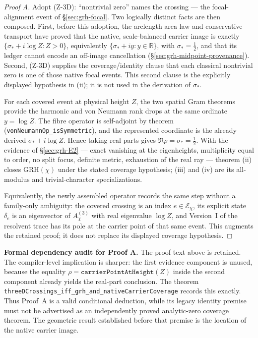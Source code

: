 \begin{proof}[Proof A]
Adopt (Z-3D): ``nontrivial zero'' names the crossing --- the focal-alignment
event of \S\ref{sec:grh-focal}.  Two logically distinct facts are then
composed.  First, before this adoption, the arclength area law and
conservative transport have proved that the native, scale-balanced carrier
image is exactly
\(\{\sigma_*+i\log Z:Z>0\}\), equivalently
\(\{\sigma_*+iy:y\in\mathbb R\}\), with
\(\sigma_*=\tfrac12\), and that its ledger cannot encode an off-image
cancellation (\S\ref{sec:grh-midpoint-provenance}).  Second, (Z-3D) supplies
the coverage/identity clause that each classical nontrivial zero is one of
those native focal events.  This second clause is the explicitly displayed
hypothesis in \textup{(ii)}; it is not used in the derivation of
\(\sigma_*\).

For each covered event at physical height \(Z\), the two spatial Gram
theorems provide the harmonic and von Neumann rank drops at the same
ordinate \(y=\log Z\).  The fibre operator is
self-adjoint by theorem
(\texttt{vonNeumannOp\_isSymmetric}), and the represented coordinate is the
already derived \(\sigma_*+i\log Z\).  Hence taking real parts gives
\(\Re\rho=\sigma_*=\tfrac12\).  With the evidence of
\S\ref{sec:grh-E2} --- exact vanishing at the eigenheights, multiplicity
equal to order, no split focus, definite metric, exhaustion of the real ray
--- theorem \textup{(ii)} closes \(\mathrm{GRH}(\chi)\) under the stated
coverage hypothesis; \textup{(iii)} and \textup{(iv)} are its all-modulus
and trivial-character specializations.

Equivalently, the newly assembled operator records the same step without a
family-only ambiguity: the covered crossing is an index
\(e\in\mathcal E_\chi\), its explicit state \(\delta_e\) is an eigenvector of
\(A^{(3)}_\chi\) with real eigenvalue \(\log Z\), and Version~I of the
resolvent trace has its pole at the carrier point of that same event.  This
augments the retained proof; it does not replace its displayed coverage
hypothesis.
\end{proof}

\medskip
\noindent\textbf{Formal dependency audit for Proof A.}  The proof text above
is retained.  The compiler-level implication is sharper: the first evidence
component is unused, because the equality
\(\rho=\texttt{carrierPointAtHeight}(Z)\) inside the second component already yields
the real-part conclusion.  The theorem
\texttt{threeDCrossings\_iff\_grh\_and\_nativeCarrierCoverage} records this
exactly.  Thus Proof~A is a valid conditional deduction, while its legacy
identity premise must not be advertised as an independently proved
analytic-zero coverage theorem.  The geometric result established before
that premise is the location of the native carrier image.

